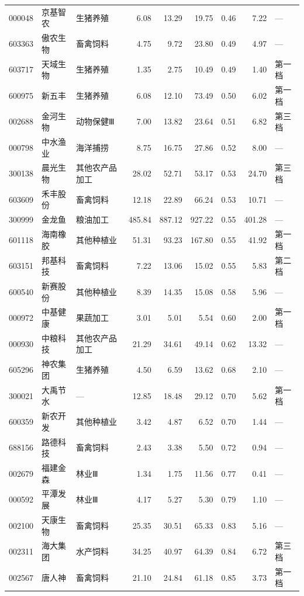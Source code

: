 \begin{longtable}{@{}llp{1.9cm}rrrrrl@{}}
000048 & 京基智农 & 生猪养殖 & 6.08 & 13.29 & 19.75 & 0.46 & 7.22 & --- \\
603363 & 傲农生物 & 畜禽饲料 & 4.75 & 9.72 & 23.80 & 0.49 & 4.97 & --- \\
603717 & 天域生物 & 生猪养殖 & 1.35 & 2.75 & 10.49 & 0.49 & 1.40 & 第一档 \\
600975 & 新五丰 & 生猪养殖 & 6.08 & 12.10 & 73.49 & 0.50 & 6.02 & 第一档 \\
002688 & 金河生物 & 动物保健Ⅲ & 7.00 & 13.82 & 23.64 & 0.51 & 6.82 & 第三档 \\
000798 & 中水渔业 & 海洋捕捞 & 8.75 & 16.75 & 27.86 & 0.52 & 8.00 & --- \\
300138 & 晨光生物 & 其他农产品加工 & 28.02 & 52.71 & 53.17 & 0.53 & 24.70 & 第三档 \\
603609 & 禾丰股份 & 畜禽饲料 & 12.18 & 22.89 & 66.24 & 0.53 & 10.71 & --- \\
300999 & 金龙鱼 & 粮油加工 & 485.84 & 887.12 & 927.22 & 0.55 & 401.28 & --- \\
601118 & 海南橡胶 & 其他种植业 & 51.31 & 93.23 & 167.80 & 0.55 & 41.92 & 第一档 \\
603151 & 邦基科技 & 畜禽饲料 & 7.22 & 13.06 & 15.02 & 0.55 & 5.83 & 第二档 \\
600540 & 新赛股份 & 其他种植业 & 8.39 & 14.35 & 15.08 & 0.58 & 5.96 & --- \\
000972 & 中基健康 & 果蔬加工 & 3.01 & 5.01 & 5.54 & 0.60 & 2.00 & 第一档 \\
000930 & 中粮科技 & 其他农产品加工 & 21.29 & 34.61 & 49.14 & 0.62 & 13.32 & --- \\
605296 & 神农集团 & 生猪养殖 & 4.50 & 6.59 & 13.62 & 0.68 & 2.10 & --- \\
300021 & 大禹节水 & --- & 12.85 & 18.48 & 29.12 & 0.70 & 5.62 & 第一档 \\
600359 & 新农开发 & 其他种植业 & 3.42 & 4.87 & 6.52 & 0.70 & 1.44 & --- \\
688156 & 路德科技 & 畜禽饲料 & 2.43 & 3.38 & 5.50 & 0.72 & 0.94 & --- \\
002679 & 福建金森 & 林业Ⅲ & 1.34 & 1.75 & 11.56 & 0.77 & 0.41 & --- \\
000592 & 平潭发展 & 林业Ⅲ & 4.17 & 5.27 & 5.30 & 0.79 & 1.10 & --- \\
002100 & 天康生物 & 畜禽饲料 & 25.35 & 30.51 & 65.33 & 0.83 & 5.16 & --- \\
002311 & 海大集团 & 水产饲料 & 34.25 & 40.97 & 64.39 & 0.84 & 6.72 & 第三档 \\
002567 & 唐人神 & 畜禽饲料 & 21.10 & 24.84 & 61.18 & 0.85 & 3.73 & 第一档 \\

\end{longtable}
